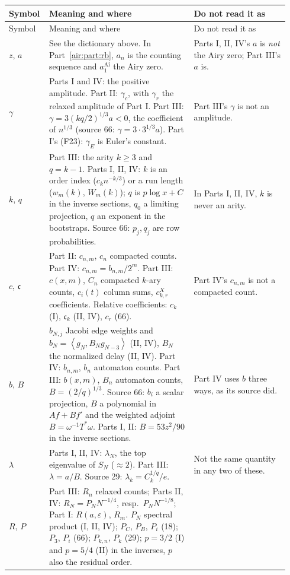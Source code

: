 \documentclass[11pt,letterpaper]{article}
\numberwithin{equation}{section}
\theoremstyle{remark}
\newcommand{\ip}[2]{\left\langle#1,#2\right\rangle}
\newcommand{\eps}{\varepsilon}
\begin{document}
{\small
\begin{longtable}{@{}>{\raggedright\arraybackslash}p{0.11\linewidth}>{\raggedright\arraybackslash}p{0.5\linewidth}>{\raggedright\arraybackslash}p{0.33\linewidth}@{}}
\toprule
Symbol & Meaning and where & Do not read it as\\
\midrule
\endfirsthead
\toprule
Symbol & Meaning and where & Do not read it as\\
\midrule
\endhead
\bottomrule
\endfoot
$z$, $a$ & See the dictionary above. In Part~\ref{air:part:rb}, $a_n$ is the counting sequence and $a_1^{\operatorname{Ai}}$ the Airy zero. & Parts I, II, IV's $a$ is \emph{not} the Airy zero; Part III's $a$ is.\\
$\gamma$ & Parts I and IV: the positive amplitude. Part II: $\gamma_c$, with $\gamma_r$ the relaxed amplitude of Part I. Part III: $\gamma=3(kq/2)^{1/3}a<0$, the coefficient of $n^{1/3}$ (source 66: $\gamma=3\cdot3^{1/3}a$). Part I's (F23): $\gamma_E$ is Euler's constant. & Part III's $\gamma$ is not an amplitude.\\
$k$, $q$ & Part III: the arity $k\ge3$ and $q=k-1$. Parts I, II, IV: $k$ is an order index ($c_kn^{-k/3}$) or a run length ($w_m(k)$, $W_m(k)$); $q$ is $p\log x+C$ in the inverse sections, $q_0$ a limiting projection, $q$ an exponent in the bootstraps. Source 66: $p_j,q_j$ are row probabilities. & In Parts I, II, IV, $k$ is never an arity.\\
$c$, $\mathfrak c$ & Part II: $c_{n,m}$, $c_n$ compacted counts. Part IV: $c_{n,m}=b_{n,m}/2^m$. Part III: $c(x,m)$, $C_n$ compacted $k$-ary counts, $c_i(t)$ column sums, $c^X_{k,r}$ coefficients. Relative coefficients: $c_k$ (I), $\mathfrak c_k$ (II, IV), $c_r$ (66). & Part IV's $c_{n,m}$ is not a compacted count.\\
$b$, $B$ & $b_{N,j}$ Jacobi edge weights and $b_N=\ip{g_N}{B_Ng_{N-3}}$ (II, IV), $B_N$ the normalized delay (II, IV). Part IV: $b_{n,m}$, $b_n$ automaton counts. Part III: $b(x,m)$, $B_n$ automaton counts, $B=(2/q)^{1/3}$. Source 66: $b_i$ a scalar projection, $B$ a polynomial in $Af+Bf'$ and the weighted adjoint $B=\omega^{-1}T^*\omega$. Parts I, II: $B=53z^2/90$ in the inverse sections. & Part IV uses $b$ three ways, as its source did.\\
$\lambda$ & Parts I, II, IV: $\lambda_N$, the top eigenvalue of $S_N$ ($\approx2$). Part III: $\lambda=a/B$. Source 29: $\lambda_k=C_k^{1/q}/e$. & Not the same quantity in any two of these.\\
$R$, $P$ & Part III: $R_n$ relaxed counts; Parts II, IV: $R_N=P_NN^{-1/4}$, resp.\ $P_NN^{-1/8}$; Part I: $R(a,\eps)$, $R_m$. $P_N$ spectral product (I, II, IV); $P_C$, $P_B$, $P_i$ (18); $P_3$, $P_i$ (66); $P_{k,n}$, $P_k$ (29); $p=3/2$ (I) and $p=5/4$ (II) in the inverses, $p$ also the residual order. & \\

\end{longtable}}
\end{document}
